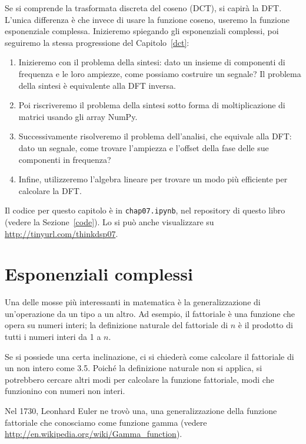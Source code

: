 \documentclass[12pt,a4paper]{book}
\begin{document}
Se si comprende la trasformata discreta del coseno (DCT), si capirà la DFT. L'unica differenza è che invece di usare la funzione coseno, useremo la funzione esponenziale complessa. Inizieremo spiegando gli esponenziali complessi, poi seguiremo la stessa progressione del Capitolo~\ref{dct}:

\begin{enumerate} 

\item Inizieremo con il problema della sintesi: dato un insieme di componenti di frequenza e le loro ampiezze, come possiamo costruire un segnale? Il problema della sintesi è equivalente alla DFT inversa.

\item Poi riscriveremo il problema della sintesi sotto forma di moltiplicazione di matrici usando gli array NumPy.

\item Successivamente risolveremo il problema dell'analisi, che equivale alla DFT: dato un segnale, come trovare l'ampiezza e l'offset della fase delle sue componenti in frequenza?

\item Infine, utilizzeremo l'algebra lineare per trovare un modo più efficiente per calcolare la DFT.

\end{enumerate} 

Il codice per questo capitolo è in {\tt chap07.ipynb}, nel repository di questo libro (vedere la Sezione~\ref{code}). Lo si può anche visualizzare su \url{http://tinyurl.com/thinkdsp07}.

\section{Esponenziali complessi} 

Una delle mosse più interessanti in matematica è la generalizzazione di un'operazione da un tipo a un altro. Ad esempio, il fattoriale è una funzione che opera su numeri interi; la definizione naturale del fattoriale di $n$ è il prodotto di tutti i numeri interi da 1 a $n$.

Se si possiede una certa inclinazione, ci si chiederà come calcolare il fattoriale di un non intero come 3.5. Poiché la definizione naturale non si applica, si potrebbero cercare altri modi per calcolare la funzione fattoriale, modi che funzionino con numeri non interi.

Nel 1730, Leonhard Euler ne trovò una, una generalizzazione della funzione fattoriale che conosciamo come funzione gamma (vedere \url{http://en.wikipedia.org/wiki/Gamma_function}).
\end{document}
